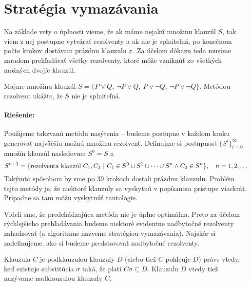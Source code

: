 \section{Stratégia vymazávania}

Na základe vety o úplnosti vieme, že ak máme nejakú množinu klauzúl $S$,
tak viem z nej postupne vytvárať rezolventy a ak nie je splniteľná, 
po konečnom počte krokov dostávam prázdnu klauzulu $\varepsilon$.
Za účelom dôkazu teda musíme zaradom prehľadávať všetky rezolventy, ktoré
môže vzniknúť zo všetkých možných dvojíc klauzúl.

\begin{priklad}
    \label{prikl:vymazavanie}
    Majme množinu klauzúl $S=\{P\lor Q,\ \neg P\lor Q,\ 
        P \lor \neg Q,\ \neg P \lor \neg Q\}$. 
    Metódou rezolvent ukážte, že $S$ nie je splniteľná.

    \paragraph{Riešenie:}
    Použijeme takzvanú metódu nasýtenia -- budeme postupne 
    v každom kroku generovať najväčšiu možnú množinu rezolvent.
    Definujme si postupnosť $\{S^i\}_{i=0}^\infty$ množín klauzúl nasledovne:
    $S^0 = S$ a
    \begin{equation*}
        S^{n+1} = \{ \mbox{rezolventa klauzúl } C_1, C_2\ | \
            C_1 \in S^0 \cup S^1 \cup \cdots \cup S^{n} \land
            C_2 \in S^n\},\quad n=1, 2, \dots
    \end{equation*}
    Takýmto spôsobom by sme po $39$ krokoch dostali prázdnu klauzulu.
    Problém tejto metódy je, že niektoré klauzuly sa vyskytnú v
    popísanom prístupe viackrát. Prípadne sa tam môžu vyskytnúť tautológie.
\end{priklad}

Videli sme, že predchádzajúca metóda nie je úplne optimálna. Preto za
účelom rýchlejšieho prehľadávania budeme niektoré evidentne nadbytočné
rezolventy zahadzovať (a algoritmus nazveme stratégiou vymazávania).
Najskôr si zadefinujeme, ako si budeme predstavovať nadbytočné rezolventy.

\begin{definicia}[podklauzula]
    Klauzula $C$ je podklauzulou klauzuly $D$ (alebo tiež $C$ pohlcuje
    $D$) práve vtedy, keď existuje substitúcia $\sigma$ taká, že platí $C\sigma
    \subseteq D$. Klauzulu $D$ vtedy tiež nazývame nadklauzulou klauzuly $C$.
\end{definicia}

